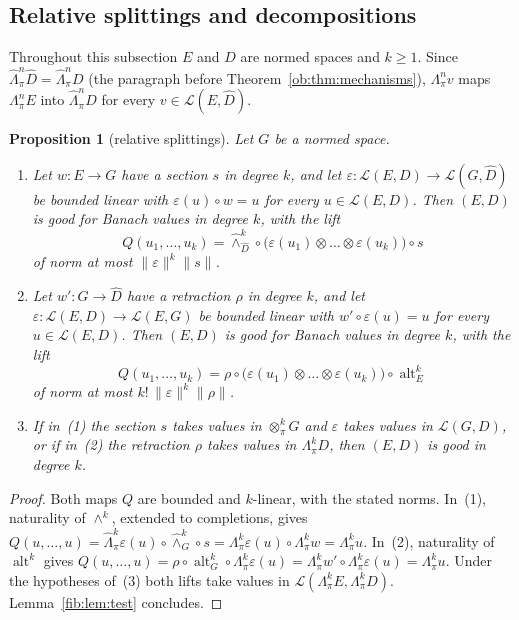 \documentclass[11pt]{amsart}
\newtheorem{proposition}[theorem]{Proposition}
\theoremstyle{definition}
\theoremstyle{remark}
\numberwithin{equation}{section}
\newcommand{\cL}{\mathcal L}
\newcommand{\norm}[1]{\lVert #1\rVert}
\theoremstyle{plain}
\theoremstyle{definition}
\theoremstyle{plain}
\newcommand{\alt}{\operatorname{alt}}
\begin{document}
\subsection{Relative splittings and decompositions}\label{cmb:ssec:decompositions}

Throughout this subsection $E$ and $D$ are normed spaces and $k\ge1$. Since
$\widehat\Lambda^n_\pi\widehat D=\widehat\Lambda^n_\pi D$ (the paragraph before Theorem~\ref{ob:thm:mechanisms}),
$\Lambda^n_\pi v$ maps $\Lambda^n_\pi E$ into $\widehat\Lambda^n_\pi D$ for every $v\in\cL(E,\widehat D)$.

\begin{proposition}[relative splittings]\label{cmb:prop:relative}
Let $G$ be a normed space.
\begin{enumerate}
\item Let $w\colon E\to G$ have a section $s$ in degree $k$, and let $\varepsilon\colon\cL(E,D)\to\cL(G,\widehat D)$ be
bounded linear with $\varepsilon(u)\circ w=u$ for every $u\in\cL(E,D)$. Then $(E,D)$ is good for Banach values in degree
$k$, with the lift
\[
 Q(u_1,\dots,u_k)=\widehat\wedge^k_{\widehat D}\circ\bigl(\varepsilon(u_1)\otimes\dots\otimes\varepsilon(u_k)\bigr)\circ s
\]
of norm at most $\norm\varepsilon^k\norm s$.
\item Let $w'\colon G\to\widehat D$ have a retraction $\rho$ in degree $k$, and let
$\varepsilon\colon\cL(E,D)\to\cL(E,G)$ be bounded linear with $w'\circ\varepsilon(u)=u$ for every $u\in\cL(E,D)$. Then
$(E,D)$ is good for Banach values in degree $k$, with the lift
\[
 Q(u_1,\dots,u_k)=\rho\circ\bigl(\varepsilon(u_1)\otimes\dots\otimes\varepsilon(u_k)\bigr)\circ\alt^k_E
\]
of norm at most $k!\,\norm\varepsilon^k\norm\rho$.
\item If in~(1) the section $s$ takes values in $\otimes^k_\pi G$ and $\varepsilon$ takes values in $\cL(G,D)$, or if
in~(2) the retraction $\rho$ takes values in $\Lambda^k_\pi D$, then $(E,D)$ is good in degree $k$.
\end{enumerate}
\end{proposition}

\begin{proof}
Both maps $Q$ are bounded and $k$-linear, with the stated norms. In~(1), naturality of $\wedge^k$, extended to
completions, gives $Q(u,\dots,u)=\widehat\Lambda^k_\pi\varepsilon(u)\circ\widehat\wedge^k_G\circ s
=\Lambda^k_\pi\varepsilon(u)\circ\Lambda^k_\pi w=\Lambda^k_\pi u$. In~(2), naturality of $\alt^k$ gives
$Q(u,\dots,u)=\rho\circ\alt^k_G\circ\Lambda^k_\pi\varepsilon(u)=\Lambda^k_\pi w'\circ\Lambda^k_\pi\varepsilon(u)
=\Lambda^k_\pi u$. Under the hypotheses of~(3) both lifts take values in $\cL(\Lambda^k_\pi E,\Lambda^k_\pi D)$.
Lemma~\ref{fib:lem:test} concludes.
\end{proof}
\end{document}

